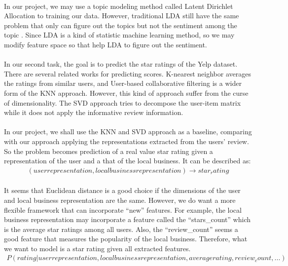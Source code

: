 \documentclass{article}
\begin{document}
\paragraph{} In our project, we may use a topic modeling method called Latent Dirichlet Allocation to training our data. However, traditional LDA still have the same problem that only can figure out the topics but not the sentiment among the topic \cite{LDA}. Since LDA is a kind of statistic machine learning method, so we may modify feature space so that help LDA to figure out the sentiment.

\paragraph{} In our second task, the goal is to predict the star ratings of the Yelp dataset. There are several related works for predicting scores. K-nearest neighbor averages the ratings from similar users, and User-based collaborative filtering is a wider form of the KNN approach. However, this kind of approach suffer from the curse of dimensionality. The SVD approach tries to decompose the user-item matrix while it does not apply the informative review information. 

\paragraph{} In our project, we shall use the KNN and SVD approach as a baseline, comparing with our approach applying the representations extracted from the users’ review. So the problem becomes prediction of a real value star rating given a representation of the user and a that of the local business. It can be described as:
\begin{align*}
(user representation,local business representation) \rightarrow star_rating
\end{align*}

\paragraph{} It seems that Euclidean distance is a good choice if the dimensions of the user and local business representation are the same. However, we do want a more flexible framework that can incorporate “new” features. For example, the local business representation may incorporate a feature called the “stars\_count” which is the average star ratings among all users. Also, the “review\_count” seems a good feature that measures the popularity of the local business. Therefore, what we want to model is a star rating given all extracted features.
\begin{align*}
P(rating | user representation, local business representation, average rating, review_count,...)
\end{align*}
\end{document}
